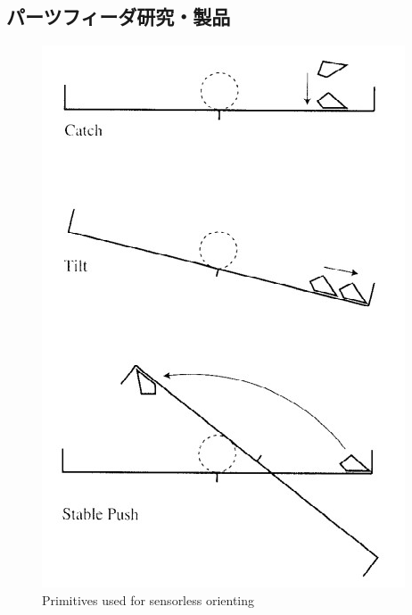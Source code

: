 \documentclass[a4paper,twoside,12pt,papersize, dvipdfmx]{iirthesis}
\begin{document}
\subsection{パーツフィーダ研究・製品}
\begin{figure}[b]
\begin{minipage}{0.49\hsize}
\centering
\includegraphics[width=0.9\hsize]{fig/1-introduction/Akella/sensorless_movement.jpg}
\caption{Primitives used for sensorless orienting \cite{akella2000}}
\label{fig::sensmov}
\end{minipage}
\begin{minipage}{0.5\hsize}
\centering

\end{minipage}
\end{figure}
\end{document}

